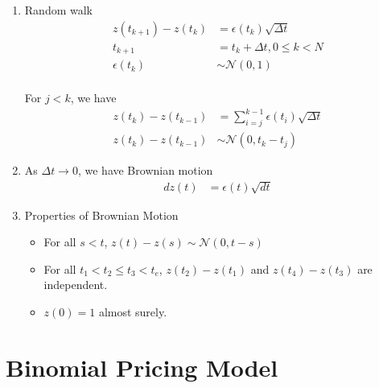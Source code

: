 \documentclass[12pt,twoside]{article}
\begin{document}
\begin{enumerate}
	\item Random walk
		\begin{align*}
			z(t_{k+1}) - z(t_{k}) &= \epsilon (t_k) \sqrt{\Delta t}\\
			t_{k+1} &= t_k +\Delta t, 0 \leq k <N \\
			\epsilon (t_k) &\sim \mathcal{N}(0,1)\\
		\end{align*}
		
		For $j<k$, we have
		\begin{align*}
			z(t_k) - z(t_{k-1}) &= \sum_{i=j}^{k-1} \epsilon (t_i)\sqrt{\Delta t}\\
			z(t_k) - z(t_{k-1}) &\sim \mathcal{N} \left(0, t_k-t_j\right)
		\end{align*}
		
	\item As $\Delta t \rightarrow 0$, we have Brownian motion
		\begin{align*}
			dz(t) & = \epsilon (t) \sqrt{dt}
		\end{align*}
		
	\item Properties of Brownian Motion
		\begin{itemize}
			\item For all $s<t$, $z(t) - z(s) \sim \mathcal{N}(0, t-s)$
			\item For all $t_1<t_2 \leq t_3 <t_e$, $z(t_2)-z(t_1)$ and $z(t_4)-z(t_3)$ are independent.
			\item $z(0) =1$ almost surely.
		\end{itemize}			


\end{enumerate}





\section{Binomial Pricing Model}
\end{document}
